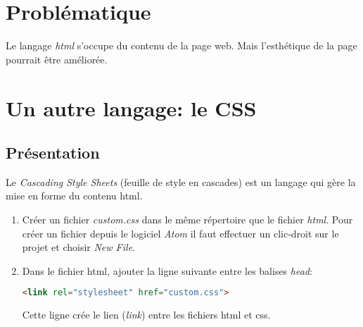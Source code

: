 \documentclass[a4paper,11pt]{article}
\begin{document}
\begin{Form}
\section{Problématique}
Le langage \emph{html} s'occupe du contenu de la page web. Mais l'esthétique de la page pourrait être améliorée.
\begin{center}
\end{center}
\section{Un autre langage: le CSS}
\subsection{Présentation}
Le \emph{Cascading Style Sheets} (feuille de style en cascades) est un langage qui gère la mise en forme du contenu html.
\begin{activite}
\begin{enumerate}
\item Créer un fichier \emph{custom.css} dans le même répertoire que le fichier \emph{html}. Pour créer un fichier depuis le logiciel \emph{Atom} il faut effectuer un clic-droit sur le projet et choisir \emph{New File}.
\item Dans le fichier html, ajouter la ligne suivante entre les balises \emph{head}:
\begin{lstlisting}[language=html]
<link rel="stylesheet" href="custom.css">
\end{lstlisting}
Cette ligne crée le lien (\emph{link}) entre les fichiers html et css.
\end{enumerate}
\end{activite}

\end{Form}
\end{document}
